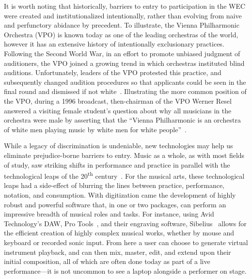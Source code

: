 \documentclass[manuscript,screen,review]{acmart}
\begin{document}
It is worth noting that historically, barriers to entry to participation in the WEC were created and institutionalized intentionally, rather than evolving from naive and perfunctory abidance by precedent.
To illustrate, the Vienna Philharmonic Orchestra (VPO) is known today as one of the leading orchestras of the world, however it has an extensive history of intentionally exclusionary practices.  Following the Second World War, in an effort to promote unbiased judgment of auditioners, the VPO joined a growing trend in which orchestras instituted blind auditions.
Unfortunately, leaders of the VPO protested this practice, and subsequently changed audition procedures so that applicants could be seen in the final round and dismissed if not white~\cite{VPO-corollary}. Illustrating the more common position of the VPO, during a 1996 broadcast, then-chairman of the VPO Werner Resel answered a visiting female student's question about why all musicians in the orchestra were male by asserting that the ``Vienna Philharmonic is an orchestra of white men playing music by white men for white people''~\cite{VPO-corollary}.

While a legacy of discrimination is undeniable, new technologies may help us eliminate prejudice-borne barriers to entry.
Music as a whole, as with most fields of study, saw striking shifts in performance and practice in parallel with the technological leaps of the 20\textsuperscript{th} century~\cite{Katz10}.
For the musical arts, these technological leaps had a side-effect of blurring the lines between practice, performance, notation, and consumption.
With digitization came the development of highly robust and powerful software that, in one or two packages, can perform an impressive breadth of musical roles and tasks.
For instance, using Avid Technology’s DAW, Pro Tools~\cite{ProTools}, and their engraving software, Sibelius~\cite{Sibelius} allows for the efficient creation of highly complex musical works, whether by mouse and keyboard or recorded sonic input.
From here a user can choose to generate virtual instrument playback, and can then mix, master, edit, and extend upon their initial composition, all of which are often done today as part of a live performance---it is not uncommon to see a laptop alongside a performer on stage. 
\end{document}
